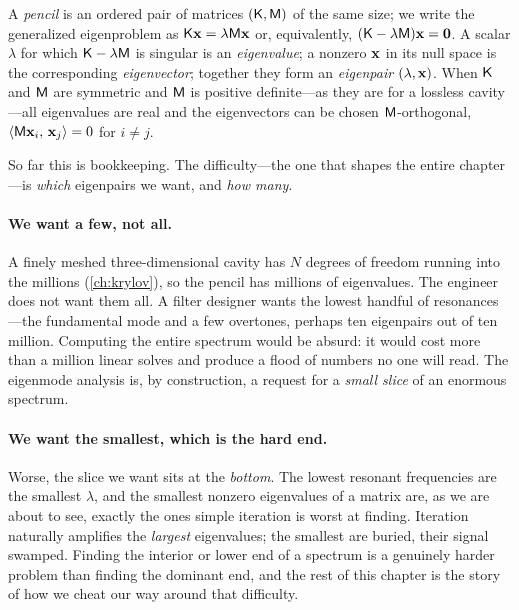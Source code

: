 \begin{notationbox}
A \emph{pencil} is an ordered pair of matrices $(\mathsf{K},\mathsf{M})$ of the same size; we
write the generalized eigenproblem as $\mathsf{K}\mathbf{x}=\lambda\mathsf{M}\mathbf{x}$ or, equivalently,
$(\mathsf{K}-\lambda\mathsf{M})\mathbf{x}=\mathbf 0$. A scalar $\lambda$ for which $\mathsf{K}-\lambda\mathsf{M}$
is singular is an \emph{eigenvalue}; a nonzero $\mathbf{x}$ in its null space is the
corresponding \emph{eigenvector}; together they form an \emph{eigenpair}
$(\lambda,\mathbf{x})$. When $\mathsf{K}$ and $\mathsf{M}$ are symmetric and $\mathsf{M}$ is positive
definite---as they are for a lossless cavity---all eigenvalues are real and the
eigenvectors can be chosen $\mathsf{M}$-orthogonal, $\left\langle \mathsf{M}\mathbf{x}_i,\, \mathbf{x}_j\right\rangle=0$ for
$i\neq j$.
\end{notationbox}

So far this is bookkeeping. The difficulty---the one that shapes the entire
chapter---is \emph{which} eigenpairs we want, and \emph{how many}.

\paragraph{We want a few, not all.} A finely meshed three-dimensional cavity has
$N$ degrees of freedom running into the millions (\cref{ch:krylov}), so the
pencil has millions of eigenvalues. The engineer does not want them all. A
filter designer wants the lowest handful of resonances---the fundamental mode and
a few overtones, perhaps ten eigenpairs out of ten million. Computing the entire
spectrum would be absurd: it would cost more than a million linear solves and
produce a flood of numbers no one will read. The eigenmode analysis is, by
construction, a request for a \emph{small slice} of an enormous spectrum.

\paragraph{We want the smallest, which is the hard end.} Worse, the slice we want
sits at the \emph{bottom}. The lowest resonant frequencies are the smallest
$\lambda$, and the smallest nonzero eigenvalues of a matrix are, as we are about
to see, exactly the ones simple iteration is worst at finding. Iteration
naturally amplifies the \emph{largest} eigenvalues; the smallest are buried,
their signal swamped. Finding the interior or lower end of a spectrum is a
genuinely harder problem than finding the dominant end, and the rest of this
chapter is the story of how we cheat our way around that difficulty.

